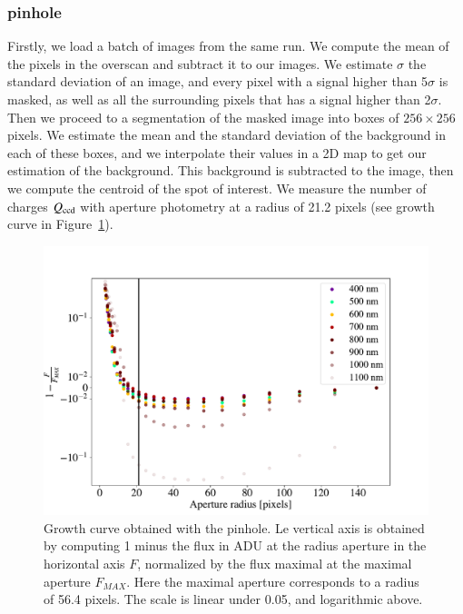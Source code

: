 \subsubsection{\spinhole pinhole}

Firstly, we load a batch of images from the same run. We compute the mean of the pixels in the overscan and subtract it to our images. We estimate $\sigma$ the standard deviation of an image, and every pixel with a signal higher than 5$\sigma$ is masked, as well as all the surrounding pixels that has a signal higher than 2$\sigma$. Then we proceed to a segmentation of the masked image into boxes of $256\times256$ pixels. We estimate the mean and the standard deviation of the background in each of these boxes, and we interpolate their values in a 2D map to get our estimation of the background. This background is subtracted to the image, then we compute the centroid of the spot of interest. We measure the number of charges $Q_{\mathrm{ccd}}$ with aperture photometry at a radius of 21.2 pixels (see growth curve in Figure~\ref{fig:growth_75um}).

\begin{figure}[h]
    \centering
    \includegraphics[width=\columnwidth]{fig/growth_curve_75um.pdf}
    \caption{Growth curve obtained with the \spinhole pinhole. Le vertical axis is obtained by computing 1 minus the flux in ADU at the radius aperture in the horizontal axis $F$, normalized by the flux maximal at the maximal aperture $F_{MAX}$. Here the maximal aperture corresponds to a radius of 56.4 pixels. The scale is linear under 0.05, and logarithmic above.}
    \label{fig:growth_75um}
\end{figure}

